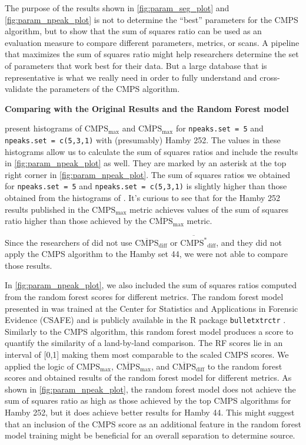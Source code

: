 The purpose of the results shown in \autoref{fig:param_seg_plot} and
\autoref{fig:param_npeak_plot} is not to determine the ``best''
parameters for the CMPS algorithm, but to show that the sum of squares
ratio can be used as an evaluation measure to compare different
parameters, metrics, or scans. A pipeline that maximizes the sum of
squares ratio might help researchers determine the set of parameters
that work best for their data. But a large database that is
representative is what we really need in order to fully understand and
cross-validate the parameters of the CMPS algorithm.

\textbf{Comparing with the Original Results and the Random Forest model}

\citet{cmps} present histograms of \(\mathrm{CMPS_{max}}\) and
\(\mathrm{\overline{CMPS}_{max}}\) for \texttt{npeaks.set\ =\ 5} and
\texttt{npeaks.set\ =\ c(5,3,1)} with (presumably) Hamby 252. The values
in these histograms allow us to calculate the sum of squares ratios and
include the results in \autoref{fig:param_npeak_plot} as well. They are
marked by an asterisk at the top right corner in
\autoref{fig:param_npeak_plot}. The sum of squares ratios we obtained
for \texttt{npeaks.set\ =\ 5} and \texttt{npeaks.set\ =\ c(5,3,1)} is
slightly higher than those obtained from the histograms of \citet{cmps}.
It's curious to see that for the Hamby 252 results published in
\citet{cmps} the \(\mathrm{{CMPS}_{max}}\) metric achieves values of the
sum of squares ratio higher than those achieved by the
\(\mathrm{\overline{CMPS}_{max}}\) metric.

Since the researchers of \citet{cmps} did not use
\(\mathrm{\overline{CMPS}_{diff}}\) or
\(\mathrm{\overline{CMPS^*}_{diff}}\), and they did not apply the CMPS
algorithm to the Hamby set 44, we were not able to compare those
results.

In \autoref{fig:param_npeak_plot}, we also included the sum of squares
ratios computed from the random forest scores \citep{aoas} for different
metrics. The random forest model presented in \citet{aoas} was trained
at the Center for Statistics and Applications in Forensic Evidence
(CSAFE) and is publicly available in the R package \texttt{bulletxtrctr}
\citep{bulletxtrctr}. Similarly to the CMPS algorithm, this random
forest model produces a score to quantify the similarity of a
land-by-land comparison. The RF scores lie in an interval of {[}0,1{]}
making them most comparable to the scaled CMPS scores. We applied the
logic of \(\mathrm{{CMPS}_{max}}\), \(\mathrm{\overline{CMPS}_{max}}\),
and \(\mathrm{\overline{CMPS}_{diff}}\) to the random forest scores and
obtained results of the random forest model for different metrics. As
shown in \autoref{fig:param_npeak_plot}, the random forest model does
not achieve the sum of squares ratio as high as those achieved by the
top CMPS algorithms for Hamby 252, but it does achieve better results
for Hamby 44. This might suggest that an inclusion of the CMPS score as
an additional feature in the random forest model training might be
beneficial for an overall separation to determine source.

